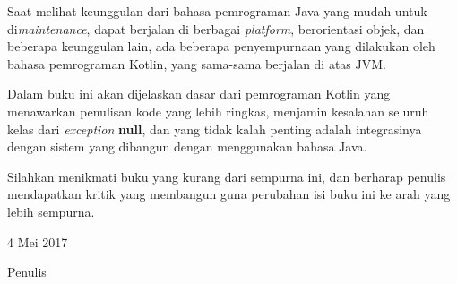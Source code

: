 \documentclass{wileysix} %
\begin{document}
\subtitle{Dasar}


\halftitlepage
 
\titlepage

\dedication{Untuk Istriku yang selalu memberi semangat, dan anak-anak yang selalu ceria}

\tableofcontents
\listoffigures
\listoftables

\begin{foreword}
Saat melihat keunggulan dari bahasa pemrograman Java yang mudah untuk di\textit{maintenance}, dapat berjalan di berbagai \textit{platform}, berorientasi objek, dan beberapa keunggulan lain, ada beberapa penyempurnaan yang dilakukan oleh bahasa pemrograman Kotlin, yang sama-sama berjalan di atas JVM. 

Dalam buku ini akan dijelaskan dasar dari pemrograman Kotlin yang menawarkan penulisan kode yang lebih ringkas, menjamin kesalahan seluruh kelas dari \textit{exception} \textbf{null}, dan yang tidak kalah penting adalah integrasinya dengan sistem yang dibangun dengan menggunakan bahasa Java.

Silahkan menikmati buku yang kurang dari sempurna ini, dan berharap penulis mendapatkan kritik yang membangun guna perubahan isi buku ini ke arah yang lebih sempurna.

\vspace{4mm}
4 Mei 2017

\vspace{5mm}
Penulis
\end{foreword}








\end{document}
